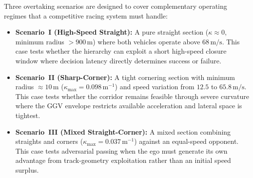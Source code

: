 Three overtaking scenarios are designed to cover complementary operating
regimes that a competitive racing system must handle:
\begin{itemize}
\item \textbf{Scenario~I (High-Speed Straight):} A pure straight section
  ($\kappa\approx0$, minimum radius $>900\,\mathrm{m}$) where both vehicles
  operate above $68\,\mathrm{m/s}$.  This case tests whether the hierarchy can
  exploit a short high-speed closure window where decision latency directly
  determines success or failure.
\item \textbf{Scenario~II (Sharp-Corner):} A tight cornering
  section with minimum radius ${\approx}10\,\mathrm{m}$
  ($\kappa_{\max}=0.098\,\mathrm{m^{-1}}$) and speed variation from $12.5$
  to $65.8\,\mathrm{m/s}$.  This case tests whether the corridor remains
  feasible through severe curvature where the GGV envelope restricts available
  acceleration and lateral space is tightest.
\item \textbf{Scenario~III (Mixed Straight-Corner):} A
  mixed section combining straights and corners
  ($\kappa_{\max}=0.037\,\mathrm{m^{-1}}$) against an equal-speed opponent.
  This case tests adversarial passing when the ego must generate its own
  advantage from track-geometry exploitation rather than an initial speed
  surplus.
\end{itemize}

